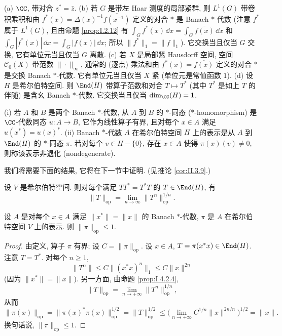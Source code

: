 \begin{example}
\label{exa:I.4.2.2}
(a) $\CC$, 带对合 $z^* = \bar{z}$.
(b) 若 $G$ 是带左 Haar 测度的局部紧群, 则 $L^1(G)$ 带卷积乘积和由 $f^*(x) = \Delta(x)^{-1}\overline{f(x^{-1})}$ 定义的对合 $*$ 是 Banach $*$-代数 (注意 $f^*$ 属于 $L^1(G)$, 且由命题 \ref{prop:I.2.12} 有 $\int_G f^*(x)\,\dd x = \int_G \overline{f(x)}\,\dd x$ 和 $\int_G |f^*(x)|\,\dd x = \int_G |f(x)|\,\dd x$; 所以 $\|f^*\|_1 = \|f\|_1$). 它交换当且仅当 $G$ 交换, 它有单位元当且仅当 $G$ 离散.
(c) 若 $X$ 是局部紧 Hausdorff 空间, 空间 $\mathcal{C}_0(X)$ 带范数 $\|\cdot\|_{\infty}$, 通常的 (逐点) 乘法和由 $f^*(x) = \overline{f(x)}$ 定义的对合 $*$ 是交换 Banach $*$-代数. 它有单位元当且仅当 $X$ 紧 (单位元是常值函数 $1$).
(d) 设 $H$ 是希尔伯特空间. 则 $\End(H)$ 带算子范数和对合 $T \longmapsto T^*$ (其中 $T^*$ 是如上 $T$ 的伴随) 是含幺 Banach $*$-代数. 它交换当且仅当 $\dim_{\CC}(H) = 1$.
\end{example}

\begin{definition}
\label{def:I.4.2.3}
(i) 若 $A$ 和 $B$ 是两个 Banach $*$-代数, 从 $A$ 到 $B$ 的 $*$-同态 ($*$-homomorphism) 是 $\CC$-代数同态 $u \colon A \to B$, 它作为线性算子有界, 且对每个 $x \in A$ 满足 $u(x^*) = u(x)^*$.
(ii) Banach $*$-代数 $A$ 在希尔伯特空间 $H$ 上的表示是从 $A$ 到 $\End(H)$ 的 $*$-同态 $\pi$. 若对每个 $v \in H - \{0\}$, 存在 $x \in A$ 使得 $\pi(x)(v) \neq 0$, 则称该表示非退化 (nondegenerate).
\end{definition}

我们将需要下面的结果, 它将在下一节中证明. (见推论 \ref{cor:II.3.9}.)

\begin{proposition}
\label{prop:I.4.2.4}
设 $V$ 是希尔伯特空间. 则对每个满足 $TT^* = T^*T$ 的 $T \in \End(H)$, 有
\[
\|T\|_{\mathrm{op}} = \lim_{n \to \infty}\|T^n\|_{\mathrm{op}}^{1/n}.
\]
\end{proposition}

\begin{corollary}[表示自动收缩]
\label{cor:I.4.2.5}
设 $A$ 是对每个 $x \in A$ 满足 $\|x^*\| = \|x\|$ 的 Banach $*$-代数, $\pi$ 是 $A$ 在希尔伯特空间 $V$ 上的表示. 则 $\|\pi\|_{\mathrm{op}} \leq 1$.
\end{corollary}

\begin{proof}
由定义, 算子 $\pi$ 有界; 设 $C = \|\pi\|_{\mathrm{op}}$. 设 $x \in A$, $T = \pi(x^*x) \in \End(H)$. 注意 $T = T^*$. 对每个 $n \geq 1$,
\[
\|T^n\| \leq C\|(x^*x)^n\|_1 \leq C\|x\|^{2n}
\]
(因为 $\|x^*\| = \|x\|$). 另一方面, 由命题 \ref{prop:I.4.2.4},
\[
\|T\|_{\mathrm{op}} = \lim_{n \to +\infty}\|T^n\|_{\mathrm{op}}^{1/n},
\]
从而
\[
\|\pi(x)\|_{\mathrm{op}} = \|\pi(x)^*\pi(x)\|_{\mathrm{op}}^{1/2} = \|T\|_{\mathrm{op}}^{1/2} \leq \bigl(\lim_{n \to +\infty}C^{1/n}\|x\|^{2n/n}\bigr)^{1/2} = \|x\|.
\]
换句话说, $\|\pi\|_{\mathrm{op}} \leq 1$.
\end{proof}

